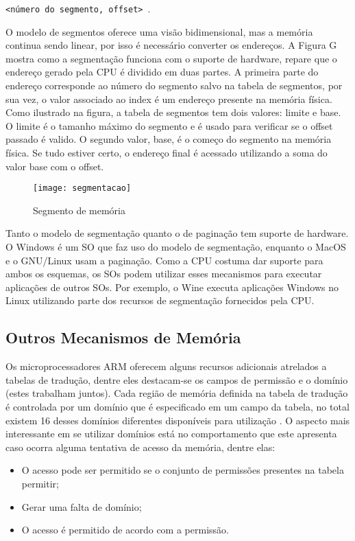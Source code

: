 \texttt{<número do segmento, offset>}~\citep{silberschatz}.

O modelo de segmentos oferece uma visão bidimensional, mas a memória continua
sendo linear, por isso é necessário converter os endereços.
A Figura G mostra como a segmentação funciona com o suporte de hardware, repare
que o endereço gerado pela CPU é dividido em duas partes. A primeira parte do
endereço corresponde ao número do segmento salvo na tabela de segmentos, por
sua vez, o valor associado ao index é um endereço presente na memória física.
Como ilustrado na figura, a tabela de segmentos tem dois valores: limite e
base. O limite é o tamanho máximo do segmento e é usado para verificar se o
offset passado é valido. O segundo valor, base, é o começo do segmento na
memória física. Se tudo estiver certo, o endereço final é acessado utilizando a
soma do valor base com o offset.

\begin{figure}[!h]
  \centering
  \texttt{[image: segmentacao]} 
  \caption{Segmento de memória}
  \label{fig:memory_segment} 
\end{figure}

Tanto o modelo de segmentação quanto o de paginação tem suporte de hardware. O
Windows é um SO que faz uso do modelo de segmentação, enquanto o MacOS e o
GNU/Linux usam a paginação. Como a CPU costuma dar suporte para ambos os
esquemas, os SOs podem utilizar esses mecanismos para executar aplicações de
outros SOs. Por exemplo, o Wine executa aplicações Windows no Linux utilizando
parte dos recursos de segmentação fornecidos pela CPU.

\subsection{Outros Mecanismos de Memória}
\label{sec:outros_mecanismos_memoria}

Os microprocessadores ARM oferecem alguns recursos adicionais atrelados a
tabelas de tradução, dentre eles destacam-se os campos de permissão e o domínio
(estes trabalham juntos). Cada região de memória definida na tabela de tradução
é controlada por um domínio que é especificado em um campo da tabela, no total
existem 16 desses domínios diferentes disponíveis para utilização
\citep{armdeveloperguide}. O aspecto mais interessante em se utilizar domínios
está no comportamento que este apresenta caso ocorra alguma tentativa de acesso
da memória, dentre elas:

\begin{itemize}
  \item O acesso pode ser permitido se o conjunto de permissões presentes na
        tabela permitir;
  \item Gerar uma falta de domínio;
  \item O acesso é permitido de acordo com a permissão.
\end{itemize}

